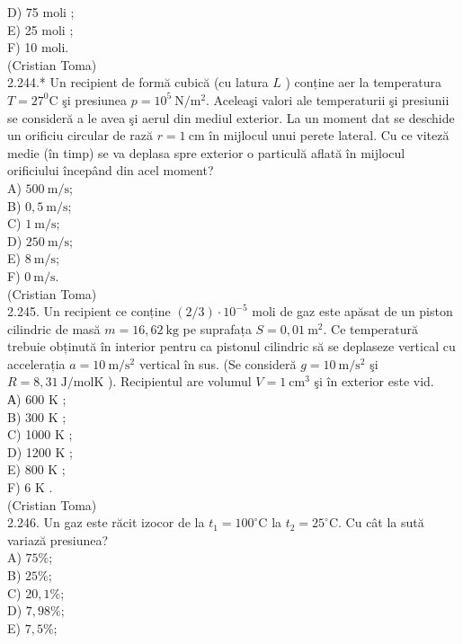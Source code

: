 \documentclass[10pt]{article}
\begin{document}
D) 75 moli ;\\
E) 25 moli ;\\
F) 10 moli.\\
(Cristian Toma)\\
2.244.* Un recipient de formă cubică (cu latura $L$ ) conține aer la temperatura $T=27^{0} \mathrm{C}$ şi presiunea $p=10^{5} \mathrm{~N} / \mathrm{m}^{2}$. Aceleaşi valori ale temperaturii şi presiunii se consideră a le avea şi aerul din mediul exterior. La un moment dat se deschide un orificiu circular de rază $r=1 \mathrm{~cm}$ în mijlocul unui perete lateral. Cu ce viteză medie (în timp) se va deplasa spre exterior o particulă aflată în mijlocul orificiului începând din acel moment?\\
A) $500 \mathrm{~m} / \mathrm{s}$;\\
B) $0,5 \mathrm{~m} / \mathrm{s}$;\\
C) $1 \mathrm{~m} / \mathrm{s}$;\\
D) $250 \mathrm{~m} / \mathrm{s}$;\\
E) $8 \mathrm{~m} / \mathrm{s}$;\\
F) $0 \mathrm{~m} / \mathrm{s}$.\\
(Cristian Toma)\\
2.245. Un recipient ce conține $(2 / 3) \cdot 10^{-5}$ moli de gaz este apăsat de un piston cilindric de masă $m=16,62 \mathrm{~kg}$ pe suprafața $S=0,01 \mathrm{~m}^{2}$. Ce temperatură trebuie obținută în interior pentru ca pistonul cilindric să se deplaseze vertical cu accelerația $a=10 \mathrm{~m} / \mathrm{s}^{2}$ vertical în sus. (Se consideră $g=10 \mathrm{~m} / \mathrm{s}^{2}$ şi $R=8,31 \mathrm{~J} / \mathrm{molK}$ ). Recipientul are volumul $V=1 \mathrm{~cm}^{3}$ şi în exterior este vid.\\
А) 600 K ;\\
B) 300 K ;\\
C) 1000 K ;\\
D) 1200 K ;\\
E) 800 K ;\\
F) 6 K .\\
(Cristian Toma)\\
2.246. Un gaz este răcit izocor de la $t_{1}=100^{\circ} \mathrm{C}$ la $t_{2}=25^{\circ} \mathrm{C}$. Cu cât la sută variază presiunea?\\
A) $75 \%$;\\
B) $25 \%$;\\
C) $20,1 \%$;\\
D) $7,98 \%$;\\
E) $7,5 \%$;\\
\end{document}
